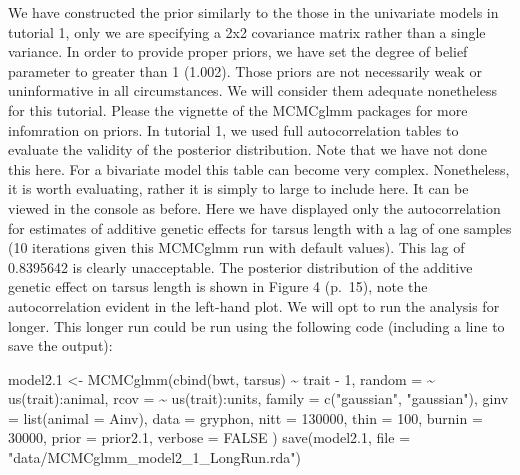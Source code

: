 \documentclass[
  12pt,
]{book}
\newenvironment{Shaded}{\begin{snugshade}}{\end{snugshade}}
\newcommand{\AttributeTok}[1]{\textcolor[rgb]{0.77,0.63,0.00}{#1}}
\newcommand{\ConstantTok}[1]{\textcolor[rgb]{0.00,0.00,0.00}{#1}}
\newcommand{\DecValTok}[1]{\textcolor[rgb]{0.00,0.00,0.81}{#1}}
\newcommand{\FloatTok}[1]{\textcolor[rgb]{0.00,0.00,0.81}{#1}}
\newcommand{\FunctionTok}[1]{\textcolor[rgb]{0.00,0.00,0.00}{#1}}
\newcommand{\NormalTok}[1]{#1}
\newcommand{\OtherTok}[1]{\textcolor[rgb]{0.56,0.35,0.01}{#1}}
\newcommand{\SpecialCharTok}[1]{\textcolor[rgb]{0.00,0.00,0.00}{#1}}
\newcommand{\StringTok}[1]{\textcolor[rgb]{0.31,0.60,0.02}{#1}}
\begin{document}
We have constructed the prior similarly to the those in the univariate models in tutorial 1, only we are specifying a 2x2 covariance matrix rather than a single variance. In order to provide proper priors, we have set the degree of belief parameter to greater than 1 (1.002). Those priors are not necessarily weak or uninformative in all circumstances. We will consider them adequate nonetheless for this tutorial. Please the vignette of the MCMCglmm packages \citep{R-MCMCglmm} for more infomration on priors. In tutorial 1, we used full autocorrelation tables to evaluate the validity of the posterior distribution. Note that we have not done this here. For a bivariate model this table can become very complex. Nonetheless, it is worth evaluating, rather it is simply to large to include here. It can be viewed in the console as before. Here we have displayed only the autocorrelation for estimates of additive genetic effects for tarsus length with a lag of one samples (10 iterations given this MCMCglmm run with default values). This lag of 0.8395642 is clearly unacceptable. The posterior distribution of the additive genetic effect on tarsus length is shown in Figure 4 (p.~15), note the autocorrelation evident in the left-hand plot. We will opt to run the analysis for longer. This longer run could be run using the following code (including a line to save the output):

\begin{Shaded}
\begin{Highlighting}[]
\NormalTok{model2}\FloatTok{.1} \OtherTok{\textless{}{-}} \FunctionTok{MCMCglmm}\NormalTok{(}\FunctionTok{cbind}\NormalTok{(bwt, tarsus) }\SpecialCharTok{\textasciitilde{}}\NormalTok{ trait }\SpecialCharTok{{-}} \DecValTok{1}\NormalTok{,}
  \AttributeTok{random =} \SpecialCharTok{\textasciitilde{}} \FunctionTok{us}\NormalTok{(trait)}\SpecialCharTok{:}\NormalTok{animal,}
  \AttributeTok{rcov =} \SpecialCharTok{\textasciitilde{}} \FunctionTok{us}\NormalTok{(trait)}\SpecialCharTok{:}\NormalTok{units,}
  \AttributeTok{family =} \FunctionTok{c}\NormalTok{(}\StringTok{"gaussian"}\NormalTok{, }\StringTok{"gaussian"}\NormalTok{),}
  \AttributeTok{ginv =} \FunctionTok{list}\NormalTok{(}\AttributeTok{animal =}\NormalTok{ Ainv), }\AttributeTok{data =}\NormalTok{ gryphon,}
  \AttributeTok{nitt =} \DecValTok{130000}\NormalTok{, }\AttributeTok{thin =} \DecValTok{100}\NormalTok{, }\AttributeTok{burnin =} \DecValTok{30000}\NormalTok{,}
  \AttributeTok{prior =}\NormalTok{ prior2}\FloatTok{.1}\NormalTok{, }\AttributeTok{verbose =} \ConstantTok{FALSE}
\NormalTok{)}
\FunctionTok{save}\NormalTok{(model2}\FloatTok{.1}\NormalTok{, }\AttributeTok{file =} \StringTok{"data/MCMCglmm\_model2\_1\_LongRun.rda"}\NormalTok{)}
\end{Highlighting}
\end{Shaded}
\end{document}
